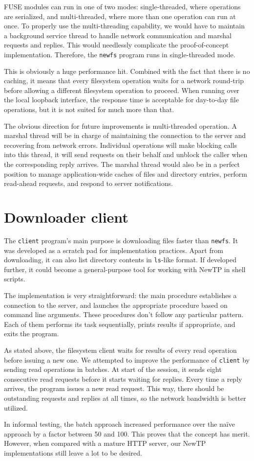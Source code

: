 FUSE modules can run in one of two modes: single-threaded, where operations are serialized, and
multi-threaded, where more than one operation can run at once. To properly use the multi-threading capability,
we would have to maintain a background service thread to handle network communication and marshal requests and
replies. This would needlessly complicate the proof-of-concept implementation. Therefore, the {\tt newfs}
program runs in single-threaded mode.

This is obviously a huge performance hit. Combined with the fact that there is no caching, it means that every
filesystem operation waits for a network round-trip before allowing a different filesystem operation to
proceed. When running over the local loopback interface, the response time is acceptable for day-to-day file
operations, but it is not suited for much more than that.

The obvious direction for future improvements is multi-threaded operation. A marshal thread will be in charge
of maintaining the connection to the server and recovering from network errors.  Individual operations will
make blocking calls into this thread, it will send requests on their behalf and unblock the caller when the
corresponding reply arrives. The marshal thread would also be in a perfect position to manage application-wide
caches of files and directory entries, perform read-ahead requests, and respond to server notifications.

\section{Downloader client}

The {\tt client} program's main purpose is downloading files faster than {\tt newfs}. It was developed as
a scratch pad for implementation practices. Apart from downloading, it can also list directory contents
in {\tt ls}-like format. If developed further, it could become a general-purpose tool for working with NewTP
in shell scripts.

The implementation is very straightforward: the main procedure establishes a connection to the server, and
launches the appropriate procedure based on command line arguments. These procedures don't follow any
particular pattern. Each of them performs its task sequentially, prints results if appropriate, and exits the
program.

As stated above, the filesystem client waits for results of every read operation before issuing a new one. We
attempted to improve the performance of {\tt client} by sending read operations in batches. At start of the
session, it sends eight consecutive read requests before it starts waiting for replies. Every time a reply
arrives, the program issues a new read request. This way, there should be outstanding requests and replies at
all times, so the network bandwidth is better utilized.

In informal testing, the batch approach increased performance over the naïve approach by a factor between 50
and 100. This proves that the concept has merit. However, when compared with a mature HTTP server,
our NewTP implementations still leave a lot to be desired.
